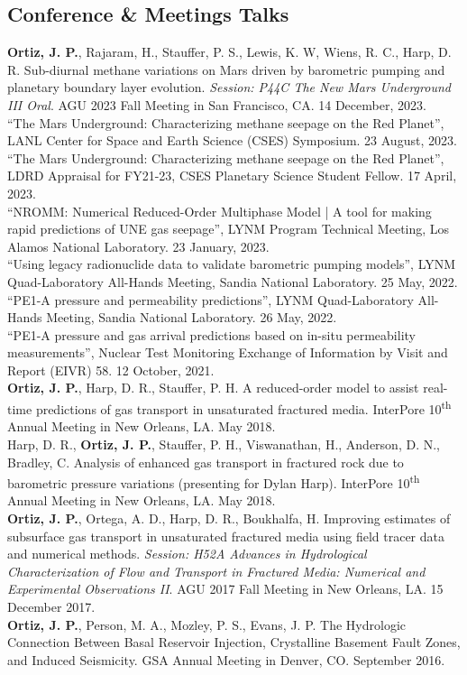 \documentclass[11pt, letterpaper]{article}
\newcommand{\years}[1]{\marginnote{\scriptsize #1}}
\begin{document}
\subsection*{Conference \& Meetings Talks}
\years{2023}\textbf{Ortiz, J. P.}, Rajaram, H., Stauffer, P. S., Lewis, K. W,
Wiens, R. C., Harp, D. R. Sub-diurnal methane variations on Mars driven by
barometric pumping and planetary boundary layer evolution. \textit{Session:
P44C The New Mars Underground III Oral}. AGU 2023 Fall Meeting in San
Francisco, CA. 14 December, 2023.\\
%
\years{2023} ``The Mars Underground: Characterizing methane seepage on the Red
Planet'', LANL Center for Space and Earth Science (CSES) Symposium. 23 August,
2023.\\ 
%
\years{2023} ``The Mars Underground: Characterizing methane seepage on the Red
Planet'', LDRD Appraisal for FY21-23, CSES Planetary Science Student Fellow. 17 April,
2023.\\
%
\years{2023} ``NROMM: Numerical Reduced-Order Multiphase Model | A tool for
making rapid predictions of UNE gas seepage'', LYNM Program Technical Meeting,
Los Alamos National Laboratory. 23 January, 2023.\\
%
\years{2022} ``Using legacy radionuclide data to validate barometric pumping
models'', LYNM Quad-Laboratory All-Hands Meeting, Sandia National Laboratory.
25 May, 2022.\\
%
\years{2022} ``PE1-A pressure and permeability predictions'', LYNM
Quad-Laboratory All-Hands Meeting, Sandia National Laboratory. 26 May, 2022.\\
%
\years{2021}
``PE1-A pressure and gas arrival predictions based on in-situ permeability
measurements'', Nuclear Test Monitoring Exchange of Information by Visit and
Report (EIVR) 58. 12 October, 2021.\\
%
\years{2018}\textbf{Ortiz, J. P.}, Harp, D. R., Stauffer, P. H. A reduced-order
model to assist real-time predictions of gas transport in unsaturated fractured
media. InterPore 10\textsuperscript{th} Annual Meeting in New Orleans, LA. May
2018.\\
%
\years{2018}Harp, D. R., \textbf{Ortiz, J. P.}, Stauffer, P. H., Viswanathan,
H., Anderson, D. N., Bradley, C. Analysis of enhanced gas transport in
fractured rock due to barometric pressure variations (presenting for Dylan
Harp). InterPore 10\textsuperscript{th} Annual Meeting in New Orleans, LA. May
2018.\\
%
\years{2017}\textbf{Ortiz, J. P.}, Ortega, A. D., Harp, D. R., Boukhalfa, H.
Improving estimates of subsurface gas transport in unsaturated fractured media
using field tracer data and numerical methods.  \textit{Session: H52A Advances
    in Hydrological Characterization of Flow and Transport in Fractured Media:
Numerical and Experimental Observations II}. AGU 2017 Fall Meeting in New
Orleans, LA. 15 December 2017. \\
%
\years{2016}\textbf{Ortiz, J. P.}, Person, M. A., Mozley, P. S., Evans, J. P.
The Hydrologic Connection Between Basal Reservoir Injection, Crystalline
Basement Fault Zones, and Induced Seismicity.  GSA Annual Meeting in Denver,
CO. September 2016.\\
\end{document}
